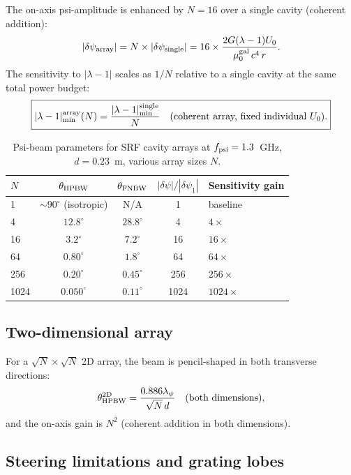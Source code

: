 \documentclass[11pt,twocolumn]{article}
\newcommand{\dpsi}{\delta\psi}
\newcommand{\lam}{\lambda}
\begin{document}
The on-axis psi-amplitude is enhanced by $N = 16$ over a single
cavity (coherent addition):
\begin{equation}
|\dpsi_{\rm array}| = N\times|\dpsi_{\rm single}|
= 16\times\frac{2G(\lam-1)U_0}{\mu_0^{\rm gal}\,c^4\,r}.
\label{eq:dpsi_array_onaxis}
\end{equation}
The sensitivity to $|\lam-1|$ scales as $1/N$ relative to a single
cavity at the same total power budget:
\begin{equation}
\boxed{
|\lam-1|_{\rm min}^{\rm array}(N) = \frac{|\lam-1|_{\rm min}^{\rm single}}{N}
\quad\text{(coherent array, fixed individual }U_0\text{)}.
}
\label{eq:lambda_min_array}
\end{equation}

\begin{table}[h!]
\caption{Psi-beam parameters for SRF cavity arrays at $f_{\rm psi} = 1.3$~GHz,
$d = 0.23$~m, various array sizes $N$.}
\label{tab:phased_array}
\begin{tabular}{lcccl}
\toprule
$N$ & $\theta_{\rm HPBW}$ & $\theta_{\rm FNBW}$
  & $|\dpsi|/|\dpsi_1|$ & Sensitivity gain \\
\midrule
1 & $\sim 90^\circ$ (isotropic) & N/A & 1 & baseline \\
4 & $12.8^\circ$ & $28.8^\circ$ & 4 & $4\times$ \\
16 & $3.2^\circ$ & $7.2^\circ$ & 16 & $16\times$ \\
64 & $0.80^\circ$ & $1.8^\circ$ & 64 & $64\times$ \\
256 & $0.20^\circ$ & $0.45^\circ$ & 256 & $256\times$ \\
1024 & $0.050^\circ$ & $0.11^\circ$ & 1024 & $1024\times$ \\
\bottomrule
\end{tabular}
\end{table}

\subsection{Two-dimensional array}

For a $\sqrt{N}\times\sqrt{N}$ 2D array, the beam is pencil-shaped
in both transverse directions:
\begin{equation}
\theta_{\rm HPBW}^{\rm 2D} = \frac{0.886\lambda_\psi}{\sqrt{N}\,d}
\quad\text{(both dimensions)},
\label{eq:HPBW_2D}
\end{equation}
and the on-axis gain is $N^2$ (coherent addition in both dimensions).

\subsection{Steering limitations and grating lobes}
\end{document}
